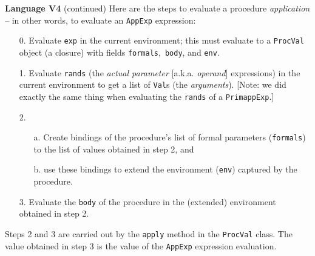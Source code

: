 \begin{minipage}[t]{\sw}
\slidenumber
\LARGE
{\bf Language V4} (continued)\exx
\Large
\emm{}\exx
\LARGE
Here are the steps to evaluate a procedure {\em application} --
in other words, to evaluate an \verb'AppExp' expression:
\begin{enumerate}
\item[0.]
    Evaluate \verb'exp' in the current environment;
    this must evaluate to a \verb'ProcVal' object (a closure)
    with fields \verb'formals',\ \verb'body', and \verb'env'.
\item[1.]
    Evaluate \verb'rands'
    (the {\em actual parameter} [a.k.a. {\em operand}] expressions)
    in the current environment
    to get a list of \verb'Val's (the {\em arguments}).
    [Note: we did exactly the same thing when evaluating the \verb'rands' 
    of a \verb'PrimappExp'.]
\item[2.]
    \begin{enumerate}
    \item[a.]
    Create bindings of the procedure's
    list of formal parameters (\verb'formals')
    to the list of values obtained in step 2, and
    \item[b.]
    use these bindings to extend the environment (\verb'env')
    captured by the procedure.
    \end{enumerate}
\item[3.]
    Evaluate the \verb'body' of the procedure
    in the (extended) environment obtained in step 2.
\end{enumerate}
Steps 2 and 3 are carried out by the \verb'apply' method
in the \verb'ProcVal' class.
The value obtained in step 3 is the value
of the \verb'AppExp' expression evaluation.
\end{minipage}
